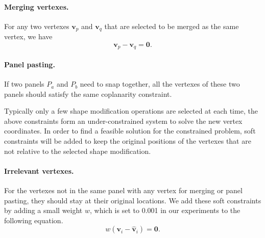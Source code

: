 {\paragraph{Merging vertexes.} 
For any two vertexes $\mathbf{v}_p$ and $\mathbf{v}_q$ that are selected to be merged as the same vertex, we have 
\begin{equation}
\mathbf{v}_p - \mathbf{v}_q = \mathbf{0}.
\label{equ:point}
\end{equation}

\paragraph{Panel pasting.}
If two panels $P_a$ and $P_b$ need to snap together, all the vertexes of these two panels should satisfy the same coplanarity constraint. 



Typically only a few shape modification operations are selected at each time, the above constraints form an under-constrained system to solve the new vertex coordinates. In order to find a feasible solution for the constrained problem, soft constraints will be added to keep the original positions of the vertexes that are not relative to the selected shape modification.

\paragraph{Irrelevant vertexes.} For the vertexes not in the same panel with any vertex for merging or panel pasting, they should stay at their original locations. 
We add these soft constraints by adding a small weight $w$, which is set to 0.001 in our experiments to the following equation. 
\begin{equation}
w(\mathbf{v}_i - \mathbf{\hat{v}}_i) = \mathbf{0}.
\label{equ:irrelevant}
\end{equation}

}
